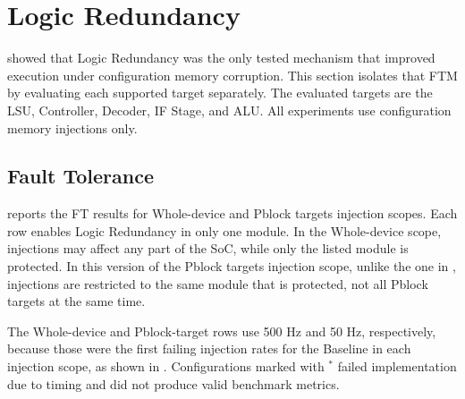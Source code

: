 \section{Logic Redundancy} 
\label{chap9:logic-Redundancy} 

 showed that Logic Redundancy was the only tested mechanism that improved execution under configuration memory corruption. This section isolates that \ac{FTM} by evaluating each supported target separately. The evaluated targets are the \ac{LSU}, Controller, Decoder, IF Stage, and \ac{ALU}. All experiments use configuration memory injections only.






\subsection{Fault Tolerance}

 reports the \ac{FT} results for Whole-device and Pblock targets injection scopes. Each row enables Logic Redundancy in only one module. In the Whole-device scope, injections may affect any part of the \ac{SoC}, while only the listed module is protected. In this version of the Pblock targets injection scope, unlike the one in , injections are restricted to the same module that is protected, not all Pblock targets at the same time.

The Whole-device and Pblock-target rows use 500 Hz and 50 Hz, respectively, because those were the first failing injection rates for the Baseline in each injection scope, as shown in . Configurations marked with \(^{*}\) failed implementation due to timing and did not produce valid benchmark metrics.

